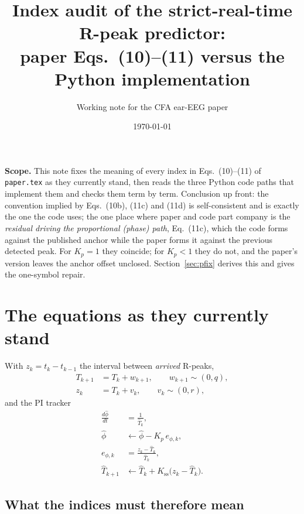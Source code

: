 \documentclass[11pt]{article}
\title{\vspace{-2em}\bfseries Index audit of the strict-real-time R-peak predictor:\\
paper Eqs.~(10)--(11) versus the Python implementation}
\author{Working note for the CFA ear-EEG paper}
\date{\today}
\newcommand{\Th}{\widehat{T}}
\newcommand{\ph}{\widehat{\phi}}
\newcommand{\code}[1]{\texttt{\small #1}}
\begin{document}
\maketitle
\vspace{-1.5em}

\noindent
\textbf{Scope.} This note fixes the meaning of every index in Eqs.~(10)--(11) of
\code{paper.tex} as they currently stand, then reads the three Python code paths that
implement them and checks them term by term. Conclusion up front: the convention implied by
Eqs.~(10b), (11c) and (11d) is self-consistent and is exactly the one the code uses; the one
place where paper and code part company is the \emph{residual driving the proportional
(phase) path}, Eq.~(11c), which the code forms against the published anchor while the paper
forms it against the previous detected peak. For $K_p=1$ they coincide; for $K_p<1$ they do
not, and the paper's version leaves the anchor offset unclosed. Section~\ref{sec:pfix}
derives this and gives the one-symbol repair.

\section{The equations as they currently stand}

With $z_k = t_k - t_{k-1}$ the interval between \emph{arrived} R-peaks,
\begin{subequations}\label{eq:rr}
\begin{align}
T_{k+1} &= T_k + w_{k+1}, \qquad w_{k+1}\sim(0,q), \label{eq:rr_a}\\
z_k     &= T_k + v_k,      \qquad v_k\sim(0,r),     \label{eq:rr_b}
\end{align}
\end{subequations}
and the PI tracker
\begin{subequations}\label{eq:pi}
\begin{align}
\frac{d\ph}{dt} &= \frac{1}{\Th_k}, \label{eq:pi_a}\\
\ph &\leftarrow \ph - K_p\,e_{\phi,k}, \label{eq:pi_b}\\
e_{\phi,k} &= \frac{z_k - \Th_k}{\Th_k}, \label{eq:pi_c}\\
\Th_{k+1} &\leftarrow \Th_k + K_{\mathrm{ss}}\bigl(z_k - \Th_k\bigr). \label{eq:pi_d}
\end{align}
\end{subequations}

\subsection{What the indices must therefore mean}
\end{document}
